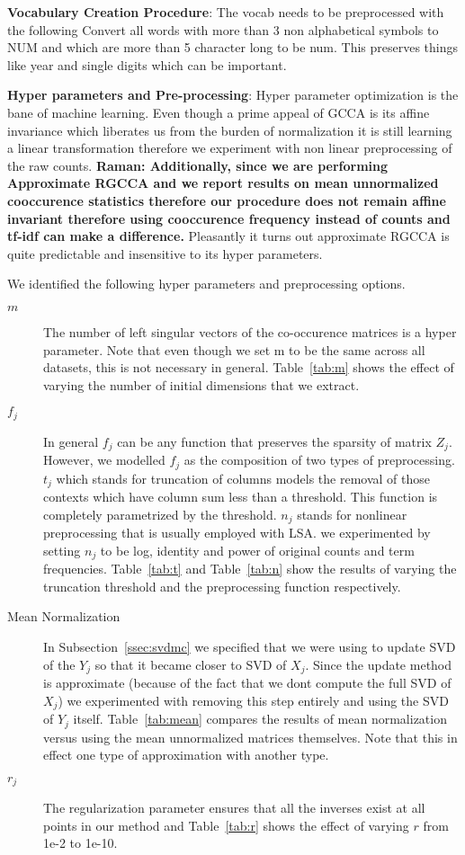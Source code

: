 \documentclass[11pt]{article}
\begin{document}
\textbf{Vocabulary Creation Procedure}: The vocab needs to be
preprocessed with the following
Convert all words with more than 3 non alphabetical symbols to NUM
and which are more than 5 character long to be num. This preserves
things like year and single digits which can be important. 

\textbf{Hyper parameters and Pre-processing}: Hyper parameter
optimization is the bane of machine learning. Even though a prime
appeal of GCCA is its affine invariance which liberates us from the 
burden of normalization it is still learning a linear transformation
therefore we experiment with non linear preprocessing of the raw
counts. \textbf{Raman: Additionally, since  we are performing Approximate RGCCA and
we report results on mean unnormalized cooccurence statistics
therefore our procedure does not remain affine invariant therefore
using cooccurence frequency instead of counts and tf-idf can make a difference.}
Pleasantly it turns out approximate RGCCA is quite predictable and
insensitive to its hyper parameters.

We identified the following hyper parameters and preprocessing
options. 
\begin{description}
\item[$m$] The number of left singular vectors of the co-occurence
  matrices is a hyper parameter. Note that even though we set m to be
  the same across all datasets, this is not necessary in
  general. Table~\ref{tab:m} shows the effect of varying the number of
  initial dimensions that we extract.
\item [$f_j$] In general $f_j$ can be any function that preserves the sparsity
  of matrix $Z_j$. However, we modelled $f_j$ as the composition of two types of
  preprocessing. $t_j$ which stands for truncation of columns models
  the removal of those contexts which have column sum less than a
  threshold. This function is completely parametrized by the
  threshold. $n_j$ stands for nonlinear preprocessing that is usually
  employed with LSA. we experimented by setting $n_j$ to be log, identity and
  power of original counts and term frequencies. Table~\ref{tab:t} and
  Table~\ref{tab:n} show the results of varying the truncation
  threshold and the preprocessing function respectively.
\item [Mean Normalization] In Subsection~\ref{ssec:svdmc} we
  specified that we were using \cite{brand2006fast} to update SVD of
  the $Y_j$ so that it became closer to SVD of $X_j$. Since the update
  method is approximate (because of the fact that we dont compute the
  full SVD of $X_j$) we experimented with removing this step entirely
  and using the SVD of $Y_j$ itself. Table~\ref{tab:mean} compares the
  results of mean normalization versus using the mean unnormalized
  matrices themselves. Note that this in effect one type of
  approximation with another type.
\item [$r_j$] The regularization parameter ensures that all the
  inverses exist at all points in our method and Table~\ref{tab:r} shows the
  effect of varying $r$ from 1e-2 to 1e-10.
\end{description}
\end{document}
